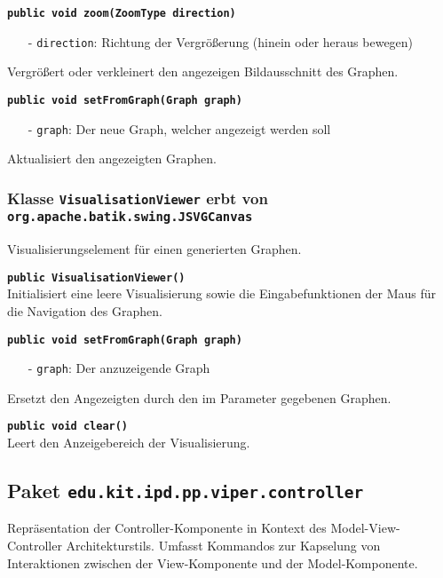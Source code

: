 \documentclass[parskip=full,11pt,twoside]{scrartcl}
\begin{document}
\textbf{\texttt{public void zoom(ZoomType direction)}}
\begin{itemize}[noitemsep]
	\item[-] \texttt{direction}: Richtung der Vergrößerung (hinein oder heraus bewegen)
\end{itemize}
Vergrößert oder verkleinert den angezeigen Bildausschnitt des Graphen.

\textbf{\texttt{public void setFromGraph(Graph graph)}}
\begin{itemize}[noitemsep]
	\item[-] \texttt{graph}: Der neue Graph, welcher angezeigt werden soll
\end{itemize}
Aktualisiert den angezeigten Graphen.

\subsubsection{Klasse \texttt{VisualisationViewer} erbt von \texttt{org.apache.batik.swing.JSVGCanvas}}

Visualisierungselement für einen generierten Graphen.

\textbf{\texttt{public VisualisationViewer()}}\\
Initialisiert eine leere Visualisierung sowie die Eingabefunktionen der Maus für die Navigation des Graphen.

\textbf{\texttt{public void setFromGraph(Graph graph)}}
\begin{itemize}[noitemsep]
	\item[-] \texttt{graph}: Der anzuzeigende Graph
\end{itemize}
Ersetzt den Angezeigten durch den im Parameter gegebenen Graphen.

\textbf{\texttt{public void clear()}}\\
Leert den Anzeigebereich der Visualisierung.

\newpage
\subsection{Paket \texttt{edu.kit.ipd.pp.viper.controller}}

Repräsentation der Controller-Komponente in Kontext des Model-View-Controller Architekturstils. Umfasst Kommandos zur Kapselung von Interaktionen zwischen der View-Komponente und der Model-Komponente.

\newpage
\newpage
\end{document}
